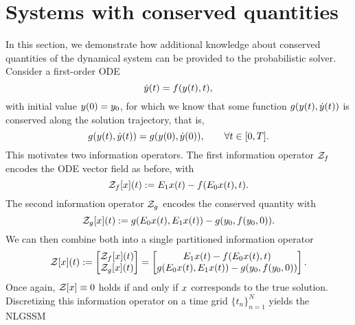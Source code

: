 \documentclass{mimosis}
\begin{document}
\section{Systems with conserved quantities}
\label{sec:orgd307b3b}
\label{sec:conserved-quantities}

In this section, we demonstrate how additional knowledge about conserved quantities of the dynamical system can be provided to the probabilistic solver.
Consider a first-order ODE
\begin{equation}
  \label{eq:conserved-ode}
  \dot{\val}(t) = \vf(\val(t), t),
\end{equation}
with initial value \(y(0) = y_0\),
for which we know that some function \(g(y(t), \dot{y}(t))\) is conserved along the solution trajectory, that is,
\begin{equation}
  \label{eq:conserved-quantity}
  g(y(t), \dot{y}(t)) = g(y(0), \dot{y}(0)), \qquad \forall t \in [0, T].
\end{equation}
This motivates two information operators.
The first information operator \(\Z_{\vf}\) encodes the ODE vector field as before, with
\begin{equation}
  \mathcal{Z}_{\vf}[\st](t) := \proj{1} \st(t) - \vf(\proj{0} \st(t), t).
\end{equation}
The second information operator \(\mathcal{Z}_g\) encodes the conserved quantity with
\begin{equation}
  \mathcal{Z}_g[\st](t) := g(\proj{0} \st(t), \proj{1} \st(t)) - g(\val_0, \vf(\val_0, 0)).
\end{equation}
We can then combine both into a single partitioned information operator
\begin{equation}
  \label{eq:conserved-infoop}
  \mathcal{Z}[\st](t)
  := \begin{bmatrix} \mathcal{Z}_{\vf}[\st](t) \\ \mathcal{Z}_g[\st](t) \end{bmatrix}
  = \begin{bmatrix} \proj{1} \st(t) - \vf(\proj{0} \st(t), t) \\ g(\proj{0} \st(t), \proj{1} \st(t)) - g(\val_0, \vf(\val_0, 0)) \end{bmatrix}.
\end{equation}
Once again, \(\mathcal{Z}[x] \equiv 0\) holds if and only if \(x\) corresponds to the true solution.
Discretizing this information operator on a time grid \(\{t_n\}_{n=1}^N\) yields the NLGSSM
\end{document}
